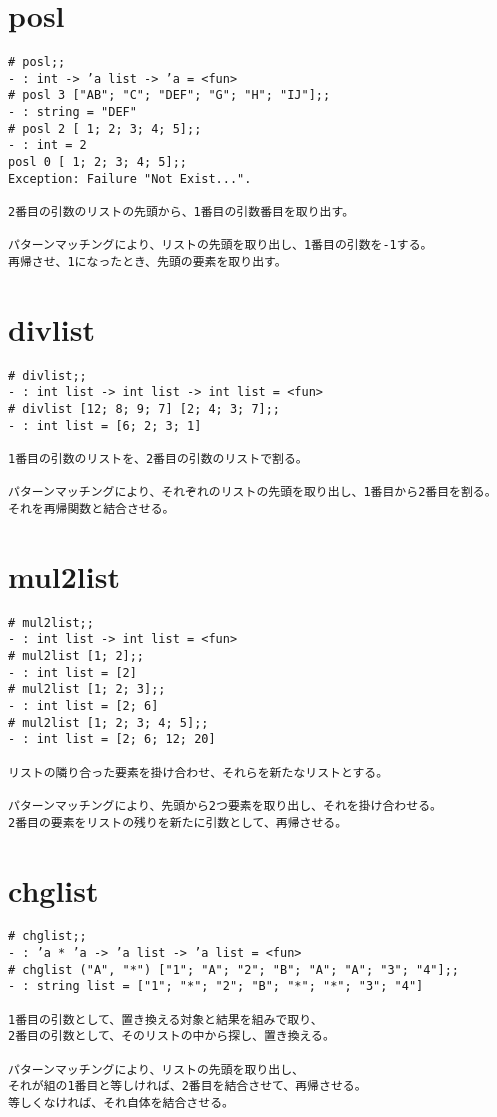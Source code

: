 \documentclass{jarticle}
\begin{document}
\newpage
\section{posl}
\begin{verbatim}
# posl;;    
- : int -> ’a list -> ’a = <fun>    
# posl 3 ["AB"; "C"; "DEF"; "G"; "H"; "IJ"];;    
- : string = "DEF"    
# posl 2 [ 1; 2; 3; 4; 5];;    
- : int = 2    
posl 0 [ 1; 2; 3; 4; 5];;    
Exception: Failure "Not Exist...".

2番目の引数のリストの先頭から、1番目の引数番目を取り出す。

パターンマッチングにより、リストの先頭を取り出し、1番目の引数を-1する。
再帰させ、1になったとき、先頭の要素を取り出す。
\end{verbatim}

\newpage
\section{divlist}
\begin{verbatim}
# divlist;;    
- : int list -> int list -> int list = <fun>
# divlist [12; 8; 9; 7] [2; 4; 3; 7];;
- : int list = [6; 2; 3; 1]

1番目の引数のリストを、2番目の引数のリストで割る。

パターンマッチングにより、それぞれのリストの先頭を取り出し、1番目から2番目を割る。
それを再帰関数と結合させる。
\end{verbatim}

\newpage
\section{mul2list}
\begin{verbatim}
# mul2list;;
- : int list -> int list = <fun>
# mul2list [1; 2];;
- : int list = [2]
# mul2list [1; 2; 3];;
- : int list = [2; 6]
# mul2list [1; 2; 3; 4; 5];;
- : int list = [2; 6; 12; 20]

リストの隣り合った要素を掛け合わせ、それらを新たなリストとする。

パターンマッチングにより、先頭から2つ要素を取り出し、それを掛け合わせる。
2番目の要素をリストの残りを新たに引数として、再帰させる。
\end{verbatim}

\newpage
\section{chglist}
\begin{verbatim}
# chglist;; 
- : ’a * ’a -> ’a list -> ’a list = <fun> 
# chglist ("A", "*") ["1"; "A"; "2"; "B"; "A"; "A"; "3"; "4"];; 
- : string list = ["1"; "*"; "2"; "B"; "*"; "*"; "3"; "4"]

1番目の引数として、置き換える対象と結果を組みで取り、
2番目の引数として、そのリストの中から探し、置き換える。

パターンマッチングにより、リストの先頭を取り出し、
それが組の1番目と等しければ、2番目を結合させて、再帰させる。
等しくなければ、それ自体を結合させる。
\end{verbatim}
\end{document}

